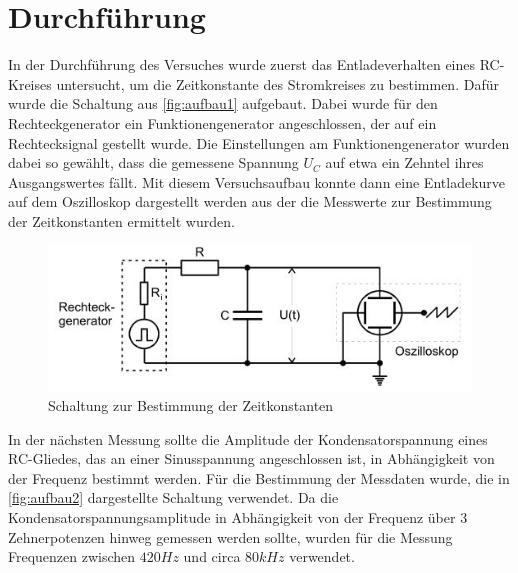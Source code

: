 \section{Durchführung}
\label{sec:Durchführung}
In der Durchführung des Versuches wurde zuerst das Entladeverhalten eines RC-Kreises untersucht, um die Zeitkonstante des Stromkreises zu bestimmen. Dafür wurde die Schaltung aus \autoref{fig:aufbau1} aufgebaut. Dabei wurde für den Rechteckgenerator ein Funktionengenerator angeschlossen, der auf ein Rechtecksignal gestellt wurde. Die Einstellungen am Funktionengenerator wurden dabei so gewählt, dass die gemessene Spannung $U_C$ auf etwa ein Zehntel ihres Ausgangswertes fällt. Mit diesem Versuchsaufbau konnte dann eine Entladekurve auf dem Oszilloskop dargestellt werden aus der die Messwerte zur Bestimmung der Zeitkonstanten ermittelt wurden. \newline
\begin{figure}
    \centering
    \includegraphics{images/SchaltungZeitkonstante.jpg}
    \caption{Schaltung zur Bestimmung der Zeitkonstanten \cite{VA}}
    \label{fig:aufbau1}
\end{figure}
In der nächsten Messung sollte die Amplitude der Kondensatorspannung eines RC-Gliedes, das an einer Sinusspannung angeschlossen ist, in Abhängigkeit von der Frequenz bestimmt werden. Für die Bestimmung der Messdaten wurde, die in \autoref{fig:aufbau2} dargestellte Schaltung verwendet. Da die Kondensatorspannungsamplitude in Abhängigkeit von der Frequenz über 3 Zehnerpotenzen hinweg gemessen werden sollte, wurden für die Messung Frequenzen zwischen $420 Hz$ und circa $80 kHz$ verwendet.\newline


